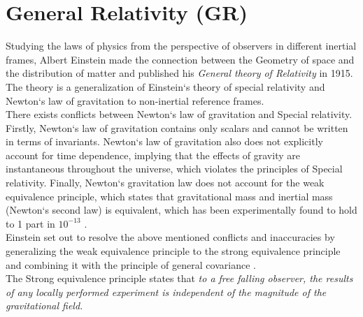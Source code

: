 \documentclass[a4paper, 11pt]{FSKH_623_Report}
\numberwithin{equation}{section}
\begin{document}
\section{General Relativity (GR)}
Studying the laws of physics from the perspective of observers in different inertial frames, Albert Einstein made the connection between the Geometry of space and the distribution of matter \citep{ITC} and published his \textit{General theory of Relativity} in 1915. The theory is a generalization of Einstein`s theory of special relativity and Newton`s law of gravitation to non-inertial reference frames.\\
There exists conflicts between Newton`s law of gravitation and Special relativity. Firstly, Newton`s law of gravitation contains only scalars and cannot be written in terms of invariants. Newton`s law of gravitation also does not explicitly account for time dependence, implying that the effects of gravity are instantaneous throughout the universe, which violates the principles of Special relativity. Finally, Newton`s gravitation law does not account for the weak equivalence principle, which states that gravitational mass and inertial mass (Newton`s second law) is equivalent, which has been experimentally found to hold to 1 part in $10^{-13}$ \citep{EP}. \\
Einstein set out to resolve the above mentioned conflicts and inaccuracies by generalizing the weak equivalence principle to the strong equivalence principle and combining it with the principle of general covariance \citep{ITC}. \\
The Strong equivalence principle states that \textit{to a free falling observer, the results of any locally performed experiment is independent of the magnitude of the gravitational field.}\citep{ITC, GRFD}  \\
\end{document}
